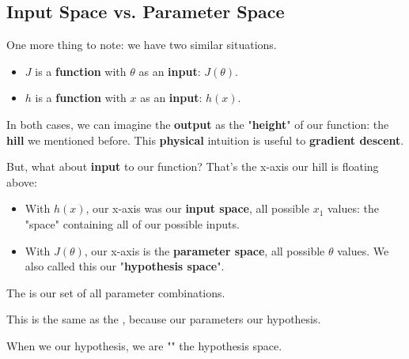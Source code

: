     \subsection{Input Space vs. Parameter Space}
    
        One more thing to note: we have two similar situations.
        
        \begin{itemize}
            \item $J$ is a \textbf{function} with $\theta$ as an \textbf{input}: $J(\theta)$.
            
            \item $h$ is a \textbf{function} with $x$ as an \textbf{input}: $h(x)$. 
        \end{itemize}
        
        In both cases, we can imagine the \textbf{output} as the "\textbf{height}" of our function: the \textbf{hill} we mentioned before. This \textbf{physical} intuition is useful to \textbf{gradient descent}.
        
        But, what about \textbf{input} to our function? That's the x-axis our hill is floating above:
        
        \begin{itemize}
            \item With $h(x)$, our x-axis was our \textbf{input space}, all possible $x_1$ values: the "space" containing all of our possible inputs.
            
            \item With $J(\theta)$, our x-axis is the \textbf{parameter space}, all possible $\theta$ values. We also called this our "\textbf{hypothesis space}".
                \\
        \end{itemize}
        
        \begin{definition}
            The  is our set of all  parameter combinations.
            
            This is the same as the , because our parameters  our hypothesis.
            
            When we  our hypothesis, we are "" the hypothesis space. 
        \end{definition}
        
